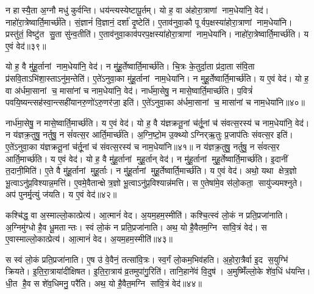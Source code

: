    न हास्यै॒ता अ॒ग्नौ मधु॑ कुर्वन्ति।
   धय॑न्त्यस्येष्टापू॒र्तम्।
   यो ह॒ वा अ॑होरा॒त्राणां नाम॒धेया॑नि॒ वेद॑।
   नाहो॑रा॒त्रेष्वार्ति॒मार्च्छ॑ति।
   सं॒ज्ञानं॑ वि॒ज्ञानं॒ दर्\mbox{}शा॑ दृ॒ष्टेति॑।
   ए॒ताव॑नुवा॒कौ पूर्वप॒क्षस्या॑\-होरा॒त्राणां नाम॒धेया॑नि।
   प्रस्तु॑तं॒ विष्टु॑त सु॒ता सु॑न्व॒तीति॑।
   ए॒ताव॑नुवा॒काव॑पर\-प॒क्षस्या॑होरा॒त्राणां नाम॒धेया॑नि।
   नाहो॑रा॒त्रेष्वार्ति॒मार्च्छ॑ति।
   य ए॒वं वेद॑॥३९॥

   यो ह॒ वै मु॑हू॒र्तानां नाम॒धेया॑नि॒ वेद॑।
   न मु॑हू॒र्तेष्वार्ति॒मार्च्छ॑ति।
   चि॒त्रः के॒तुर्दा॒ता प्र॑दा॒ता स॑वि॒ता प्र॑सवि॒ताऽभि॑शा॒स्ताऽनु॑\-म॒न्तेति॑।
   ए॒ते॑ऽनुवा॒का मु॑हू॒र्तानां नाम॒धेया॑नि।
   न मुहू॒र्तेष्वार्ति॒मार्च्छ॑ति।
   य ए॒वं वेद॑।
   यो ह॒ वा अ॑र्धमा॒सानां च॒ मासा॑नां च नाम॒धेया॑नि॒ वेद॑।
   नार्ध॑मा॒सेषु॒ न मासे॒ष्वार्ति॒मार्च्छ॑ति।
   प॒वित्रं॑ पवयि॒ष्यन्त्सह॑\-स्वा॒न्त्सही॑यानरु॒णो॑ऽरु॒णर॑जा॒ इति॑।
   ए॒ते॑ऽनुवा॒का अ॑र्धमा॒सानां च॒ मासा॑नां च नाम॒धेया॑नि॥४०॥

   नार्ध॑मा॒सेषु॒ न मासे॒ष्वार्ति॒मार्च्छ॑ति।
   य ए॒वं वेद॑।
   यो ह॒ वै य॑ज्ञक्रतू॒नां च॑र्तू॒नां च॑ संवत्स॒रस्य॑ च नाम॒धेया॑नि॒ वेद॑।
   न य॑ज्ञक्र॒तुषु॒ नर्तुषु॒ न सं॑वत्स॒र आर्ति॒मार्च्छ॑ति।
   अ॒ग्नि॒ष्टो॒म उ॒क्थ्योऽग्निर्{‌}ऋ॒तुः प्र॒जाप॑तिः संवत्स॒र इति॑।
   ए॒ते॑ऽनुवा॒का य॑ज्ञक्रतू॒नां च॑र्तू॒नां च॑ संवत्स॒रस्य॑ च नाम॒धेया॑नि॥४१॥
   न य॑ज्ञक्र॒तुषु॒ नर्तुषु॒ न सं॑वत्स॒र आर्ति॒मार्च्छ॑ति।
   य ए॒वं वेद॑।
   यो ह॒ वै मु॑हू॒र्तानां मुहू॒र्तान् वेद॑।
   न मु॑हू॒र्तानां मुहू॒र्तेष्वार्ति॒मार्च्छ॑ति।
   इ॒दानीं त॒दानी॒मिति॑।
   ए॒ते वै मु॑हू॒र्तानां मुहू॒र्ताः।
   न मु॑हू॒र्तानां मुहू॒र्तेष्वार्ति॒मार्च्छ॑ति।
   य ए॒वं वेद॑।
   अथो॒ यथा क्षेत्र॒ज्ञो भू॒त्वाऽनु॑प्र॒विश्यान्न॒मत्ति॑।
   ए॒वमे॒वैतान्क्षेत्र॒ज्ञो भू॒त्वाऽनु॑प्र॒विश्यान्न॑मत्ति।
   स ए॒तेषा॑मे॒व स॑लो॒कता॒ सायु॑ज्यमश्नुते।
   अप॑ पुनर्मृ॒त्युं ज॑यति।
   य ए॒वं वेद॑॥४२॥
\anuvakamend
				
   कश्चि॑द्ध॒ वा अ॒स्माल्लो॒कात्प्रेत्य॑।
   आ॒त्मानं॑ वेद।
   अ॒यम॒हम॒स्मीति॑।
   कश्चि॒त्स्वं लो॒कं न प्रति॒प्रजा॑नाति।
   अ॒ग्निमु॑ग्धो है॒व धू॒मतान्तः।
   स्वं लो॒कं न प्रति॒प्रजा॑नाति।
   अथ॒ यो है॒वैतम॒ग्नि सा॑वि॒त्रं वेद॑।
   स ए॒वास्माल्लो॒कात्प्रेत्य॑।
   आ॒त्मानं॑ वेद।
   अ॒यम॒हम॒स्मीति॑॥४३॥

   स स्वं लो॒कं प्रति॒प्रजा॑नाति।
   ए॒ष उ॑ वे॒वैनं॒ तत्सा॑वि॒त्रः।
   स्व॒र्गं लो॒कम॒भिव॑हति।
   अ॒हो॒रा॒त्रैर्वा इ॒द स॒युग्भि॑ क्रियते।
   इ॒ति॒रा॒त्राया॑दीक्षिषत।
   इ॒ति॒रा॒त्राय॑ व्र॒तमुपा॑गु॒रिति॑।
   तानि॒हाने॑वं वि॒दुष॑।
   अ॒मुष्मिँ॑ल्लो॒के शे॑व॒धिं ध॑यन्ति।
   धी॒त है॒व स शे॑व॒धिमनु॒ परै॑ति।
   अथ॒ यो है॒वैत॒मग्नि सा॑वि॒त्रं वेद॑॥४४॥

